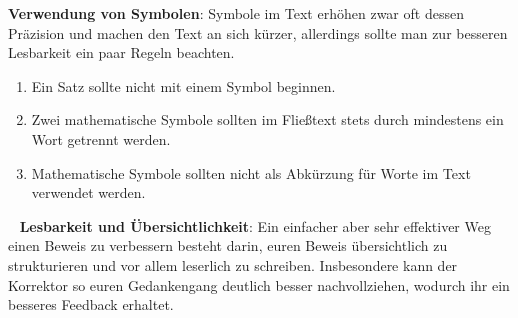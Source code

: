 \textbf{Verwendung von Symbolen}:\newline
Symbole im Text erhöhen zwar oft dessen Präzision und machen den Text an sich
kürzer, allerdings sollte man zur besseren Lesbarkeit ein paar Regeln beachten.
\begin{enumerate}
    \item
    Ein Satz sollte nicht mit einem Symbol beginnen.
    \item
    Zwei mathematische Symbole sollten im Fließtext stets durch mindestens ein Wort getrennt werden.
    \item
    Mathematische Symbole sollten nicht als Abkürzung für Worte im Text verwendet werden.
\end{enumerate}\
\newline
\textbf{Lesbarkeit und Übersichtlichkeit}: \newline
Ein einfacher aber sehr effektiver Weg einen Beweis zu verbessern besteht darin,
euren Beweis übersichtlich zu strukturieren und vor allem leserlich zu schreiben.
Insbesondere kann der Korrektor so euren Gedankengang deutlich besser
nachvollziehen, wodurch ihr ein besseres Feedback erhaltet.
